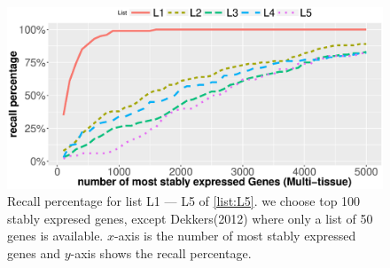 \documentclass[11pt, a4paper]{article}
\begin{document}

\begin{figure}[h!]
    \begin{center}
	\includegraphics[scale=0.5]{Figures/rankVSrank_RNA2.eps}
	\caption{Recall percentage for list L1 --- L5 of \ref{list:L5}.  we choose top 100 stably expresed genes, except Dekkers(2012) where only a list of 50 genes is available. $x$-axis is the number of most stably expressed genes and $y$-axis shows the recall percentage.}
	\label{fig:rankVSrank_RNA}
    \end{center}
\end{figure}
\end{document}
